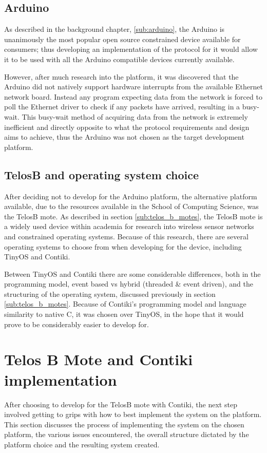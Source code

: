 \subsection{Arduino} %
\label{sec:arduino}
As described in the background chapter, \ref{sub:arduino}, the Arduino is unanimously the most popular open source constrained device available for consumers; thus developing an implementation of the protocol for it would allow it to be used with all the Arduino compatible devices currently available.

However, after much research into the platform, it was discovered that the Arduino did not natively support hardware interrupts from the available Ethernet network board.\cite{ArduinoEthernet} Instead any program expecting data from the network is forced to poll the Ethernet driver to check if any packets have arrived, resulting in a busy-wait. This busy-wait method of acquiring data from the network is extremely inefficient and directly opposite to what the protocol requirements and design aims to achieve, thus the Arduino was not chosen as the target development platform.

\subsection{TelosB and operating system choice}
After deciding not to develop for the Arduino platform, the alternative platform available, due to the resources available in the School of Computing Science, was the TelosB mote. As described in section \ref{sub:telos_b_motes}, the TelosB mote is a widely used device within academia for research into wireless sensor networks and constrained operating systems. Because of this research, there are several operating systems to choose from when developing for the device, including TinyOS and Contiki.

Between TinyOS and Contiki there are some considerable differences, both in the programming model, event based vs hybrid (threaded \& event driven), and the structuring of the operating system, discussed previously in section \ref{sub:telos_b_motes}. Because of Contiki's programming model and language similarity to native C, it was chosen over TinyOS, in the hope that it would prove to be considerably easier to develop for.


\section{Telos B Mote and Contiki implementation} %
\label{sec:contiki}
After choosing to develop for the TelosB mote with Contiki, the next step involved getting to grips with how to best implement the system on the platform. This section discusses the process of implementing the system on the chosen platform, the various issues encountered, the overall structure dictated by the platform choice and the resulting system created. 

